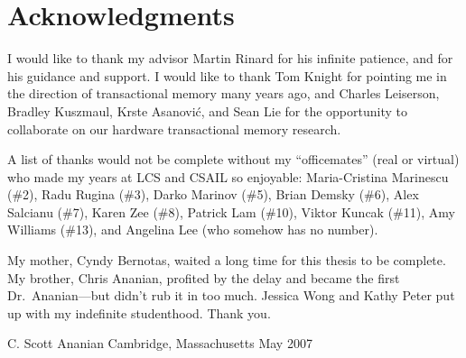 \clearpage
\section*{Acknowledgments}

I would like to thank my advisor Martin Rinard for his infinite
patience, and for his guidance and support.  I would like to thank Tom
Knight for pointing me in the direction of transactional memory many
years ago, and Charles Leiserson, Bradley Kuszmaul, Krste Asanovi\'c,
and Sean Lie for the opportunity to collaborate on our
hardware transactional memory research.

A list of thanks would not be complete without
my ``officemates'' (real or virtual) who made my
years at LCS and CSAIL so enjoyable: Maria-Cristina Marinescu (\#2),
Radu Rugina (\#3), Darko Marinov (\#5), Brian Demsky (\#6), Alex
Salcianu (\#7), Karen Zee (\#8), Patrick Lam (\#10), Viktor Kuncak (\#11), 
Amy Williams (\#13), and Angelina Lee (who somehow has no number).

My mother, Cyndy Bernotas, waited a long time for this thesis to be
complete.  My brother, Chris Ananian, profited by the delay and became
the first Dr.~Ananian---but didn't rub it in too much.
Jessica Wong and Kathy Peter put up with my
indefinite studenthood.  Thank you.

\begin{flushright}
C. Scott Ananian\tight
Cambridge, Massachusetts\tight
May 2007
\end{flushright}

